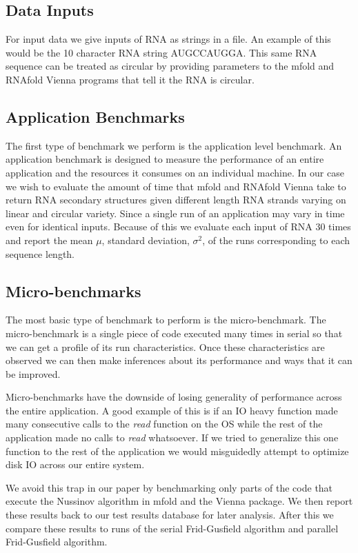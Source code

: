 \documentclass[12pt]{article}
\begin{document}
\subsection{Data Inputs}
\par For input data we give inputs of RNA as strings in a file. An example of this
would be the 10 character RNA string AUGCCAUGGA. This same RNA sequence can be
treated as circular by providing parameters to the mfold and RNAfold Vienna
programs that tell it the RNA is circular\cite{mfold-manual, vienna-manual}.
\subsection{Application Benchmarks}
\par The first type of benchmark we perform is the application level benchmark.
An application benchmark is designed to measure the performance of an entire
application and the resources it consumes on an individual machine\cite{jain}.
In our case we wish to evaluate the amount of time that mfold and RNAfold Vienna
take to return RNA secondary structures given different length RNA strands varying
on linear and circular variety. Since a single run of an application may vary in
time even for identical inputs. Because of this we evaluate each input of RNA 30
times and report the mean $\mu$, standard deviation, $\sigma^2$, of the runs
corresponding to each sequence length.

\subsection{Micro-benchmarks}
\par The most basic type of benchmark to perform is the micro-benchmark. The
micro-benchmark is a single piece of code executed many times in serial so that
we can get a profile of its run characteristics\cite{eulogy,sysperformance}.
Once these characteristics are observed we can then make inferences about its
performance and ways that it can be improved.
\par Micro-benchmarks have the downside
of losing generality of performance across the entire application\cite{eulogy, sysperformance}.
A good example of this is if an IO heavy function made many consecutive calls to
the \textit{read} function on the OS while the rest of the application made no
calls to \textit{read} whatsoever. If we tried to generalize this one function to
the rest of the application we would misguidedly attempt to optimize disk IO
across our entire system.
\par We avoid this trap in our paper by benchmarking only parts of the code that
execute the Nussinov algorithm in mfold and the Vienna package. We then report
these results back to our test results database for later analysis. After this we
compare these results to runs of the serial Frid-Gusfield algorithm and parallel
Frid-Gusfield algorithm.
\end{document}
